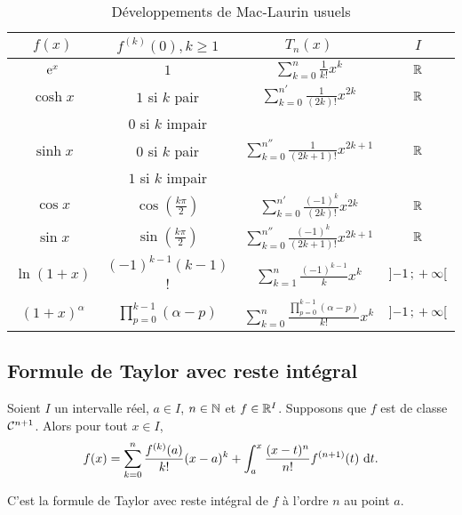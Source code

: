 \begin{table}[!h]
  \centering
  \begin{tabular}{|c|c|c|c|}\hline
    \(f(x)\) &  \(f^{(k)}(0), k\geqslant 1\) & \(T_n(x)\) & \(I\) \\ \hline
    \(\operatorname{e}^x\) &  \(1\) & \(\sum_{k = 0}^n \frac{1}{k!}x^k\) & \(\mathbb{R}\) \\ \hline
    \(\cosh x\)  & \(1\) si \(k\) pair & \(\sum_{k = 0}^{n'}
    \frac{1}{(2k)!}x^{2k}\) & \(\mathbb{R}\) \\
    &  \(0\) si \(k\) impair & & \\ \hline
    \(\sinh x\)  & \(0\) si \(k\) pair & \(\sum_{k = 0}^{n''}
    \frac{1}{(2k+1)!}x^{2k+1}\) & \(\mathbb{R}\) \\
    &  \(1\) si \(k\) impair & & \\ \hline
    \(\cos x\)  & \(\cos\left(\frac{k\pi}{2}\right)\) & \(\sum_{k = 0}^{n'}
    \frac{(-1)^k}{(2k)!}x^{2k}\) & \(\mathbb{R}\) \\ \hline
    \(\sin x\)  & \(\sin\left(\frac{k\pi}{2}\right)\) & \(\sum_{k = 0}^{n''}
    \frac{(-1)^k}{(2k+1)!}x^{2k+1}\) & \(\mathbb{R}\) \\ \hline
    \(\ln(1+x)\)  & \((-1)^{k-1}(k-1)\)! & \(\sum_{k = 1}^n \frac{(-1)^{k-1}}{k}
    x^k\) & \(\left] -1 \, ; {} +\infty \right[\) \\ \hline
    \((1+x)^\alpha\) & \(\prod_{p = 0}^{k-1} (\alpha-p)\) & \(\sum_{k = 0}^n
    \frac{\prod_{p = 0}^{k-1} (\alpha-p)}{k!} x^k\) &
    \(\left] -1 \, ; {} +\infty \right[\) \\ \hline
  \end{tabular}
  \caption{Développements de Mac-Laurin usuels}
  \label{tab:MacLaurin}
\end{table}

\subsection{Formule de Taylor avec reste intégral}

\begin{theo}
  Soient \(I\) un intervalle réel, \(a \in I\), \(n \in \mathbb{N}\) et \(f \in \mathbb{R}^I\).
  Supposons que \(f\) est de classe \(\mathcal{C}^{n+1}\). Alors pour tout \(x \in
  I\),
  \begin{equation}
    f(x) = \sum_{k = 0}^n \frac{f^{(k)}(a)}{k!} (x-a)^k + \int_a^x
    \frac{(x-t)^n}{n!} f^{(n+1)}(t)\,\mathop{}\mathopen{}\mathrm{d} t.
  \end{equation}

  C'est la formule de Taylor avec reste intégral de \(f\) à l'ordre \(n\) au
  point \(a\).
\end{theo}

